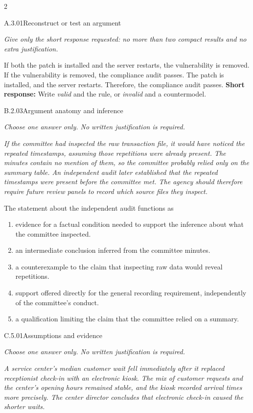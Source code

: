 \documentclass[9pt]{extarticle}
\newcommand{\choice}[1]{\item #1}
\begin{document}
\begin{multicols}{2}
\begin{DenseCoreProblem}{A.3.01}{Reconstruct or test an argument}
{\scriptsize\textit{Give only the short response requested: no more than two compact results and no extra justification.}\par}
If both the patch is installed and the server restarts, the vulnerability is removed. If the vulnerability is removed, the compliance audit passes. The patch is installed, and the server restarts. Therefore, the compliance audit passes.
\textbf{Short response:} Write \emph{valid} and the rule, or \emph{invalid} and a countermodel.
\end{DenseCoreProblem}
\begin{DenseCoreProblem}{B.2.03}{Argument anatomy and inference}
{\scriptsize\textit{Choose one answer only. No written justification is required.}\par}
\emph{If the committee had inspected the raw transaction file, it would have noticed the repeated timestamps, assuming those repetitions were already present. The minutes contain no mention of them, so the committee probably relied only on the summary table. An independent audit later established that the repeated timestamps were present before the committee met. The agency should therefore require future review panels to record which source files they inspect.}

The statement about the independent audit functions as
\begin{enumerate}[label=(\alph*)]
  \choice{evidence for a factual condition needed to support the inference about what the committee inspected.}
  \choice{an intermediate conclusion inferred from the committee minutes.}
  \choice{a counterexample to the claim that inspecting raw data would reveal repetitions.}
  \choice{support offered directly for the general recording requirement, independently of the committee's conduct.}
  \choice{a qualification limiting the claim that the committee relied on a summary.}
\end{enumerate}
\end{DenseCoreProblem}
\columnbreak
\begin{DenseCoreProblem}{C.5.01}{Assumptions and evidence}
{\scriptsize\textit{Choose one answer only. No written justification is required.}\par}
\emph{A service center's median customer wait fell immediately after it replaced receptionist check-in with an electronic kiosk. The mix of customer requests and the center's opening hours remained stable, and the kiosk recorded arrival times more precisely. The center director concludes that electronic check-in caused the shorter waits.}


\end{DenseCoreProblem}
\end{multicols}
\end{document}
